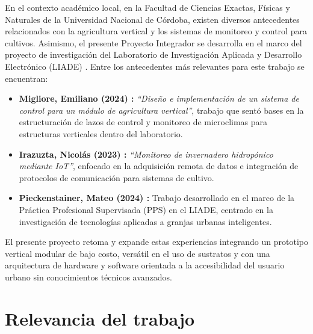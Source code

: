 En el contexto académico local, en la Facultad de Ciencias Exactas, Físicas y Naturales de la Universidad Nacional de Córdoba, existen diversos antecedentes relacionados con la agricultura vertical y los sistemas de monitoreo y control para cultivos. Asimismo, el presente Proyecto Integrador se desarrolla en el marco del proyecto de investigación del Laboratorio de Investigación Aplicada y Desarrollo Electrónico (LIADE) \cite{vanella2023}. Entre los antecedentes más relevantes para este trabajo se encuentran:
\begin{itemize}
    \item \textbf{Migliore, Emiliano (2024) \cite{migliore2024}:} \textit{“Diseño e implementación de un sistema de control para un módulo de agricultura vertical”}, trabajo que sentó bases en la estructuración de lazos de control y monitoreo de microclimas para estructuras verticales dentro del laboratorio.
    \item \textbf{Irazuzta, Nicolás (2023) \cite{irazuzta2023}:} \textit{“Monitoreo de invernadero hidropónico mediante IoT”}, enfocado en la adquisición remota de datos e integración de protocolos de comunicación para sistemas de cultivo.
    \item \textbf{Pieckenstainer, Mateo (2024) \cite{pieckenstainer2024}:} Trabajo desarrollado en el marco de la Práctica Profesional Supervisada (PPS) en el LIADE, centrado en la investigación de tecnologías aplicadas a granjas urbanas inteligentes.
\end{itemize}

El presente proyecto retoma y expande estas experiencias integrando un prototipo vertical modular de bajo costo, versátil en el uso de sustratos y con una arquitectura de hardware y software orientada a la accesibilidad del usuario urbano sin conocimientos técnicos avanzados.

\section{Relevancia del trabajo}
\label{sec:relevancia}

